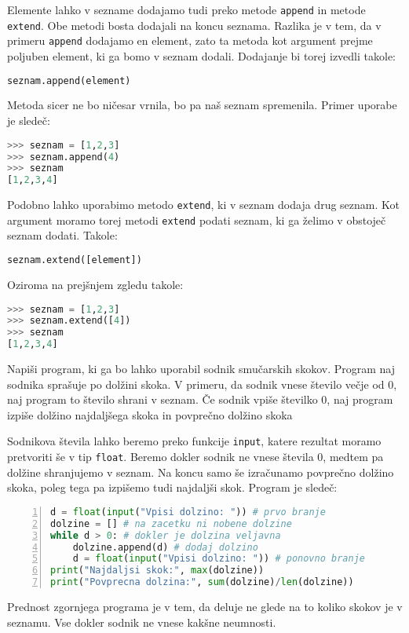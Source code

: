 Elemente lahko v sezname dodajamo tudi preko metode \texttt{append} in metode \texttt{extend}. Obe metodi bosta dodajali na koncu seznama. Razlika je v tem, da v primeru \texttt{append} dodajamo en element, zato ta metoda kot argument prejme poljuben element, ki ga bomo v seznam dodali. Dodajanje bi torej izvedli takole:
\begin{lstlisting}[language=Python]
seznam.append(element)
\end{lstlisting}
Metoda sicer ne bo ničesar vrnila, bo pa naš seznam spremenila. Primer uporabe je sledeč:
\begin{lstlisting}[language=Python]
>>> seznam = [1,2,3]
>>> seznam.append(4)
>>> seznam
[1,2,3,4]
\end{lstlisting}
Podobno lahko uporabimo metodo \texttt{extend}, ki v seznam dodaja drug seznam. Kot argument moramo torej metodi \texttt{extend} podati seznam, ki ga želimo v obstoječ seznam dodati. Takole:
\begin{lstlisting}[language=Python]
seznam.extend([element])
\end{lstlisting}
Oziroma na prejšnjem zgledu takole:
\begin{lstlisting}[language=Python]
>>> seznam = [1,2,3]
>>> seznam.extend([4])
>>> seznam
[1,2,3,4]
\end{lstlisting}

\begin{zgled}
Napiši program, ki ga bo lahko uporabil sodnik smučarskih skokov. Program naj sodnika sprašuje po dolžini skoka. V primeru, da sodnik vnese število večje od 0, naj program to število shrani v seznam. Če sodnik vpiše številko 0, naj program izpiše dolžino najdaljšega skoka in povprečno dolžino skoka
\end{zgled}
\begin{resitev}
Sodnikova števila lahko beremo preko funkcije \texttt{input}, katere rezultat moramo pretvoriti še v tip \texttt{float}. Beremo dokler sodnik ne vnese števila 0, medtem pa dolžine shranjujemo v seznam. Na koncu samo še izračunamo povprečno dolžino skoka, poleg tega pa izpišemo tudi najdaljši skok. Program je sledeč:
\begin{lstlisting}[language=Python,numbers=left]
d = float(input("Vpisi dolzino: ")) # prvo branje
dolzine = [] # na zacetku ni nobene dolzine
while d > 0: # dokler je dolzina veljavna
    dolzine.append(d) # dodaj dolzino
    d = float(input("Vpisi dolzino: ")) # ponovno branje
print("Najdaljsi skok:", max(dolzine))
print("Povprecna dolzina:", sum(dolzine)/len(dolzine))
\end{lstlisting}
\end{resitev}
Prednost zgornjega programa je v tem, da deluje ne glede na to koliko skokov je v seznamu. Vse dokler sodnik ne vnese kakšne neumnosti.






